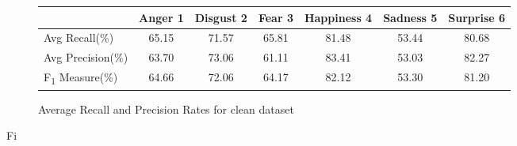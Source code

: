 \begin{figure}[h]
\begin{center}
\caption{Average Recall and Precision Rates for clean dataset}
\begin{tabular}{ | l || c | c | c | c | c | c | }
    \hline
          & Anger 1 & Disgust 2 & Fear 3 & Happiness 4 & Sadness 5 & Surprise 6 \\ \hline \hline
        Avg Recall(\%) & 65.15 & 71.57 & 65.81 & 81.48 & 53.44 & 80.68 \\ \hline
        Avg Precision(\%) & 63.70 & 73.06 & 61.11 & 83.41 & 53.03 & 82.27\\ \hline
        F\textsubscript{1} Measure(\%) & 64.66 & 72.06 & 64.17 & 82.12 & 53.30 & 81.20 \\ \hline
    \end{tabular}
    \label{fig:averageRecall}
\end{center}
\end{figure}


Fi
